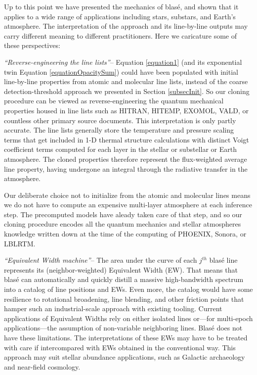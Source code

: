\documentclass[twocolumn]{aastex631}
\begin{document}
Up to this point we have presented the mechanics of blas\'e, and shown that it applies to a wide range of applications including stars, substars, and Earth's atmosphere. The interpretation of the approach and its line-by-line outputs may carry different meaning to different practitioners.  Here we caricature some of these perspectives:


\emph{``Reverse-engineering the line lists''}-- Equation \ref{equation1} (and its exponential twin Equation \ref{equationOpacitySum}) could have been populated with initial line-by-line properties from atomic and molecular line lists, instead of the coarse detection-threshold approach we presented in Section \ref{subsecInit}.  So our cloning procedure can be viewed as reverse-engineering the quantum mechanical properties housed in line lists such as HITRAN, HITEMP, EXOMOL, VALD, or countless other primary source documents.  This interpretation is only partly accurate.  The line lists generally store the temperature and pressure scaling terms that get included in 1-D thermal structure calculations with distinct Voigt coefficient terms computed for each layer in the stellar or substellar or Earth atmosphere.  The cloned properties therefore represent the flux-weighted average line property, having undergone an integral through the radiative transfer in the atmosphere.

Our deliberate choice not to initialize from the atomic and molecular lines means we do not have to compute an expensive multi-layer atmosphere at each inference step.  The precomputed models have aleady taken care of that step, and so our cloning procedure encodes all the quantum mechanics and stellar atmospheres knowledge written down at the time of the computing of PHOENIX, Sonora, or LBLRTM.


\emph{``Equivalent Width machine''}-- The area under the curve of each $j^{th}$ blas\'e line represents its (neighbor-weighted) Equivalent Width (EW).  That means that blas\'e can automatically and quickly distill a massive high-bandwidth spectrum into a catalog of line positions and EWs.  Even more, the catalog would have some resilience to rotational broadening, line blending, and other friction points that hamper such an industrial-scale approach with existing tooling.  Current applications of Equivalent Widths rely on either isolated lines or---for multi-epoch applications---the assumption of non-variable neighboring lines.  Blas\'e does not have these limitations.  The interpretations of these EWs may have to be treated with care if intercompared with EWs obtained in the conventional way.  This approach may suit stellar abundance applications, such as Galactic archaeology and near-field cosmology.
\end{document}
